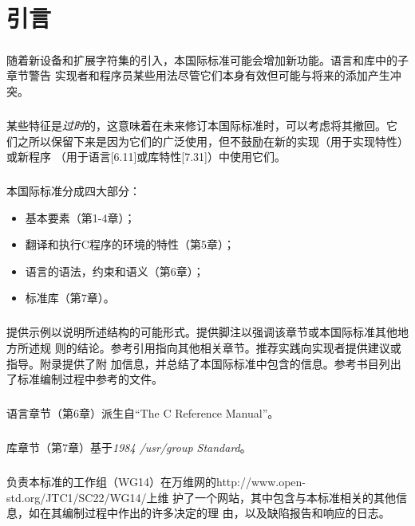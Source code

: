 \chapter*{引言}

\setcounter{paragraph}{0}

\paragraph{}
随着新设备和扩展字符集的引入，本国际标准可能会增加新功能。语言和库中的子章节警告
实现者和程序员某些用法尽管它们本身有效但可能与将来的添加产生冲突。

\paragraph{}
某些特征是\textit{过时}的，这意味着在未来修订本国际标准时，可以考虑将其撤回。它
们之所以保留下来是因为它们的广泛使用，但不鼓励在新的实现（用于实现特性）或新程序
（用于语言[6.11]或库特性[7.31]）中使用它们。

\paragraph{}
本国际标准分成四大部分：
\begin{itemize}
  \item{基本要素（第1-4章）；}
  \item{翻译和执行C程序的环境的特性（第5章）；}
  \item{语言的语法，约束和语义（第6章）；}
  \item{标准库（第7章）。}
\end{itemize}

\paragraph{}
提供示例以说明所述结构的可能形式。提供脚注以强调该章节或本国际标准其他地方所述规
则的结论。参考引用指向其他相关章节。推荐实践向实现者提供建议或指导。附录提供了附
加信息，并总结了本国际标准中包含的信息。参考书目列出了标准编制过程中参考的文件。

\paragraph{}
语言章节（第6章）派生自``The C Reference Manual''。

\paragraph{}
库章节（第7章）基于\textit{1984 /usr/group Standard}。

\paragraph{}
负责本标准的工作组（WG14）在万维网的http://www.open-std.org/JTC1/SC22/WG14/上维
护了一个网站，其中包含与本标准相关的其他信息，如在其编制过程中作出的许多决定的理
由，以及缺陷报告和响应的日志。

